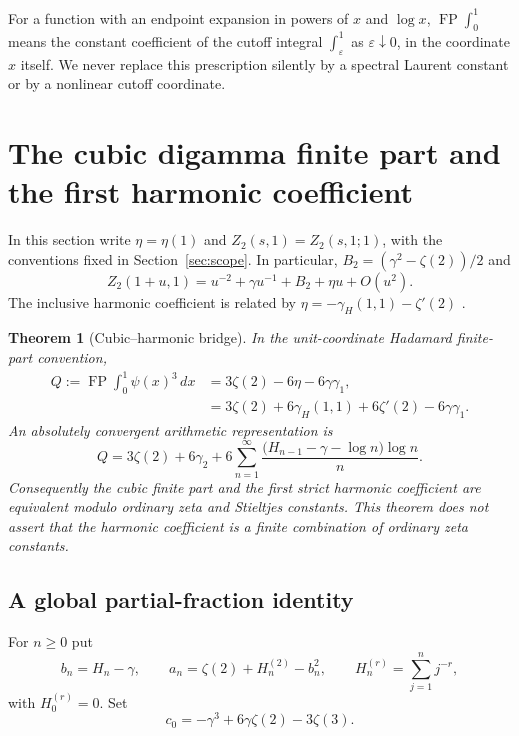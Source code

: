\documentclass[11pt]{article}
\numberwithin{equation}{section}
\newtheorem{theorem}{Theorem}[section]
\theoremstyle{definition}
\theoremstyle{remark}
\newcommand{\FP}{\operatorname{FP}}
\begin{document}
For a function with an endpoint expansion in powers of $x$ and
$\log x$, $\FP\int_0^1$ means the constant coefficient of the cutoff
integral $\int_\varepsilon^1$ as $\varepsilon\downarrow0$, in the
coordinate $x$ itself. We never replace this prescription silently
by a spectral Laurent constant or by a nonlinear cutoff coordinate.


\section{The cubic digamma finite part and the first harmonic coefficient}
\label{bridge:sec}

In this section write $\eta=\eta(1)$ and $Z_2(s,1)=Z_2(s,1;1)$,
with the conventions fixed in Section~\ref{sec:scope}. In particular,
$B_2=(\gamma^2-\zeta(2))/2$ and
\[
 Z_2(1+u,1)=u^{-2}+\gamma u^{-1}+B_2+\eta u+O(u^2).
\]
The inclusive harmonic coefficient is related by
$\eta=-\gamma_H(1,1)-\zeta'(2)$ \cite{Kargin,IncomingOrdered}.

\begin{theorem}[Cubic--harmonic bridge]\label{bridge:main}
In the unit-coordinate Hadamard finite-part convention,
\begin{align}
 Q:=\operatorname{FP}\int_0^1\psi(x)^3\,dx
 &=3\zeta(2)-6\eta-6\gamma\gamma_1,\label{bridge:eta}\\
 &=3\zeta(2)+6\gamma_H(1,1)+6\zeta'(2)-6\gamma\gamma_1.
 \label{bridge:harmonic}
\end{align}
An absolutely convergent arithmetic representation is
\begin{equation}\label{bridge:arithmetic}
 Q=3\zeta(2)+6\gamma_2+
  6\sum_{n=1}^{\infty}
   \frac{\bigl(H_{n-1}-\gamma-\log n\bigr)\log n}{n}.
\end{equation}
Consequently the cubic finite part and the first strict harmonic
coefficient are equivalent modulo ordinary zeta and Stieltjes constants.
This theorem does not assert that the harmonic coefficient is a finite
combination of ordinary zeta constants.
\end{theorem}

\subsection{A global partial-fraction identity}

For $n\ge0$ put
\[
 b_n=H_n-\gamma,\qquad
 a_n=\zeta(2)+H_n^{(2)}-b_n^2,
 \qquad H_n^{(r)}=\sum_{j=1}^n j^{-r},
\]
with $H_0^{(r)}=0$.  Set
\[
 c_0=-\gamma^3+6\gamma\zeta(2)-3\zeta(3).
\]
\end{document}

